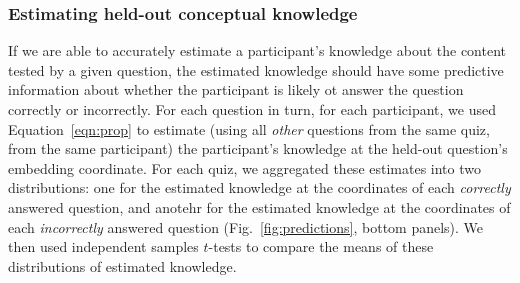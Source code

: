 \documentclass[10pt]{article}
\begin{document}
\subsubsection*{Estimating held-out conceptual knowledge}

If we are able to accurately estimate a participant's knowledge about the
content tested by a given question, the estimated knowledge should have some
predictive information about whether the participant is likely ot answer the
question correctly or incorrectly. For each question in turn, for each
participant, we used Equation~\ref{eqn:prop} to estimate (using all
\textit{other} questions from the same quiz, from the same participant) the
participant's knowledge at the held-out question's embedding coordinate. For
each quiz, we aggregated these estimates into two distributions: one for the
estimated knowledge at the coordinates of each \textit{correctly} answered
question, and anotehr for the estimated knowledge at the coordinates of each
\textit{incorrectly} answered question (Fig.~\ref{fig:predictions}, bottom
panels). We then used independent samples $t$-tests to compare the means of
these distributions of estimated knowledge.




\end{document}
